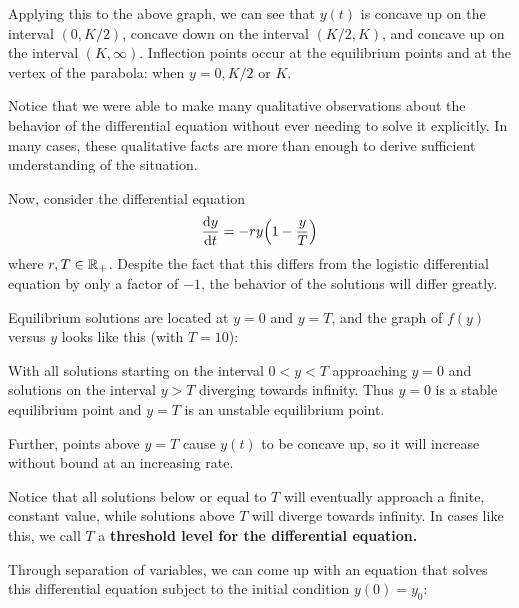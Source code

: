 \begin{example}
Applying this to the above graph, we can see that $y(t)$ is concave up on the interval $(0, K/2)$, concave down on the interval $(K/2, K)$, and concave up on the interval $(K, \infty)$. Inflection points occur at the equilibrium points and at the vertex of the parabola: when $y=0,K/2$ or $K$. \par
Notice that we were able to make many qualitative observations about the behavior of the differential equation without ever needing to solve it explicitly. In many cases, these qualitative facts are more than enough to derive sufficient understanding of the situation. 
\end{example}
\begin{example}
    Now, consider the differential equation
    \[ \dv{y}{t} = -ry \pqty{1-\frac{y}{T}} \]
    where $r,T\in\mathbb{R}_+$. Despite the fact that this differs from the logistic differential equation by only a factor of $-1$, the behavior of the solutions will differ greatly. \par
    Equilibrium solutions are located at $y=0$ and $y=T$, and the graph of $f(y)$ versus $y$ looks like this (with $T=10$):
    \begin{figure}[h!]
        \centering
    \end{figure}
    With all solutions starting on the interval $0 < y < T$ approaching $y=0$ and solutions on the interval $y > T$ diverging towards infinity. Thus $y=0$ is a stable equilibrium point and $y=T$ is an unstable equilibrium point. \par
    Further, points above $y=T$ cause $y(t)$ to be concave up, so it will increase without bound at an increasing rate. \par
    Notice that all solutions below or equal to $T$ will eventually approach a finite, constant value, while solutions above $T$ will diverge towards infinity. In cases like this, we call $T$ a \bf{threshold level} for the differential equation. \par
    Through separation of variables, we can come up with an equation that solves this differential equation subject to the initial condition $y(0) = y_0$:

\end{example}
